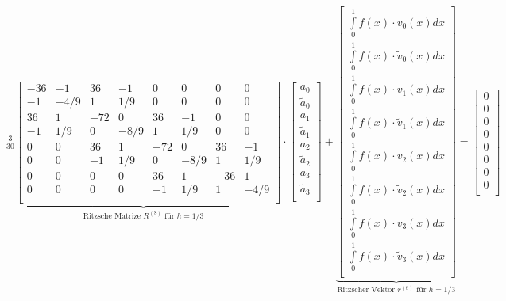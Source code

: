 $\underset{\text{Ritzsche Matrize $R^{(8)}$ für } h=1/3}{\underbrace{\frac{3}{30}\begin{bmatrix}
				-36 & -1   & 36  & -1   & 0   & 0    & 0   & 0    \\
				-1  & -4/9 & 1   & 1/9  & 0   & 0    & 0   & 0    \\
				36  & 1    & -72 & 0    & 36  & -1   & 0   & 0    \\
				-1  & 1/9  & 0   & -8/9 & 1   & 1/9  & 0   & 0    \\
				0   & 0    & 36  & 1    & -72 & 0    & 36  & -1   \\
				0   & 0    & -1  & 1/9  & 0   & -8/9 & 1   & 1/9  \\
				0   & 0    & 0   & 0    & 36  & 1    & -36 & 1    \\
				0   & 0    & 0   & 0    & -1  & 1/9  & 1   & -4/9 \\
			\end{bmatrix}}}\cdot\begin{bmatrix}
		a_0         \\
		\tilde{a}_0 \\
		a_1         \\
		\tilde{a}_1 \\
		a_2         \\
		\tilde{a}_2 \\
		a_3         \\
		\tilde{a}_3 \\
	\end{bmatrix}
	+\underset{\text{Ritzscher Vektor $r^{(8)}$ für } h=1/3}{\underbrace{\begin{bmatrix}
				\int\limits_{0}^{1}{f(x)\cdot v_0(x)dx}         \\
				\int\limits_{0}^{1}{f(x)\cdot \tilde{v}_0(x)dx} \\
				\int\limits_{0}^{1}{f(x)\cdot v_1(x)dx}         \\
				\int\limits_{0}^{1}{f(x)\cdot \tilde{v}_1(x)dx} \\
				\int\limits_{0}^{1}{f(x)\cdot v_2(x)dx}         \\
				\int\limits_{0}^{1}{f(x)\cdot \tilde{v}_2(x)dx} \\
				\int\limits_{0}^{1}{f(x)\cdot v_3(x)dx}         \\
				\int\limits_{0}^{1}{f(x)\cdot \tilde{v}_3(x)dx} \\
			\end{bmatrix}}}=
	\begin{bmatrix}
		0 \\
		0 \\
		0 \\
		0 \\
		0 \\
		0 \\
		0 \\
		0 \\
	\end{bmatrix}
$\\







